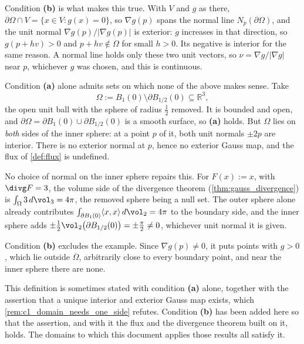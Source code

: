 Condition \textbf{(b)} is what makes this true. With $V$ and $g$ as there,
$\partial\Omega \cap V = \{x \in V : g(x) = 0\}$, so $\nabla g(p)$ spans the normal line
$N_p(\partial\Omega)$, and the unit normal $\nabla g(p)/\lvert\nabla g(p)\rvert$ is exterior:
$g$ increases in that direction, so $g(p+hv) > 0$ and $p + hv \notin \Omega$ for small $h > 0$.
Its negative is interior for the same reason. A normal line holds only these two unit vectors,
so $\nu = \nabla g/\lvert\nabla g\rvert$ near $p$, whichever $g$ was chosen, and this is
continuous.

\begin{remark}
\label{rem:c1_domain_needs_one_side}
Condition \textbf{(a)} alone admits sets on which none of the above makes sense. Take
\[\Omega := B_1(0) \setminus \partial B_{1/2}(0) \subseteq \mathbb{R}^3,\]
the open unit ball with the sphere of radius $\tfrac12$ removed. It is bounded and open, and
$\partial\Omega = \partial B_1(0) \cup \partial B_{1/2}(0)$ is a smooth surface, so
\textbf{(a)} holds. But $\Omega$ lies on \emph{both} sides of the inner sphere: at a point $p$
of it, both unit normals $\pm 2p$ are interior. There is no exterior normal at $p$, hence no
exterior Gauss map, and the flux of \cref{def:flux} is undefined.

No choice of normal on the inner sphere repairs this. For $F(x) := x$, with $\divg F = 3$, the
volume side of the divergence theorem (\cref{thm:gauss_divergence}) is
$\int_\Omega 3\,d\vol_3 = 4\pi$, the removed sphere being a null set. The outer sphere alone
already contributes $\int_{\partial B_1(0)}\langle x,x\rangle\,d\vol_2 = 4\pi$ to the boundary
side, and the inner sphere adds $\pm\tfrac12\vol_2\big(\partial B_{1/2}(0)\big) = \pm\tfrac{\pi}{2}
\neq 0$, whichever unit normal it is given.

Condition \textbf{(b)} excludes the example. Since $\nabla g(p) \neq 0$, it puts points with
$g > 0$, which lie outside $\overline\Omega$, arbitrarily close to every boundary point, and
near the inner sphere there are none.
\end{remark}

\begin{ainote}
This definition is sometimes stated with condition \textbf{(a)} alone, together with the
assertion that a unique interior and exterior Gauss map exists, which
\cref{rem:c1_domain_needs_one_side} refutes. Condition \textbf{(b)} has been added here so that the assertion, and with it the flux
and the divergence theorem built on it, holds. The domains to which this document applies those
results all satisfy it.
\end{ainote}

